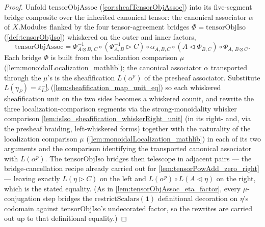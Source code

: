 \begin{proof}
  \leanok
  Unfold \(\mathrm{tensorObjAssoc}\) (\cref{cor:sheafTensorObjAssoc}) into its
  five-segment bridge composite over the inherited canonical tensor: the canonical
  associator \(\alpha\) of \(X.\mathrm{Modules}\) flanked by the four tensor-agreement
  bridges \(\Phi = \mathrm{tensorObjIso}\) (\cref{def:tensorObjIso}) whiskered on the
  outer and inner factors,
  \[
    \mathrm{tensorObjAssoc} = \Phi^{-1}_{A\otimes B,\,C}
      \circ (\Phi^{-1}_{A,B} \rhd C) \circ \alpha_{A,B,C}
      \circ (A \lhd \Phi_{B,C}) \circ \Phi_{A,\,B\otimes C}.
  \]
  Each bridge \(\Phi\) is built from the localization comparison \(\mu\)
  (\cref{lem:monoidalLocalization_mathlib}); the canonical associator \(\alpha\)
  transported through the \(\mu\)'s is the sheafification \(L(\alpha^{p})\) of the
  presheaf associator. Substitute \(L(\eta_P) = \varepsilon_{LP}^{-1}\)
  (\cref{lem:sheafification_map_unit_eq}) so each whiskered sheafification unit on the
  two sides becomes a whiskered counit, and rewrite the three localization-comparison
  segments via the strong-monoidality whisker comparison
  \cref{lem:isIso_sheafification_whiskerRight_unit} (in its right- and, via the
  presheaf braiding, left-whiskered forms) together with the naturality of the
  localization comparison \(\mu\) (\cref{lem:monoidalLocalization_mathlib}) in each of
  its two arguments and the comparison identifying the transported canonical associator
  with \(L(\alpha^{p})\). The \(\mathrm{tensorObjIso}\) bridges
  then telescope in adjacent pairs --- the bridge-cancellation recipe already carried
  out for \cref{lem:tensorPowAdd_zero_right} --- leaving exactly
  \(L(\eta \rhd C)\) on the left and \(L(\alpha^{p}) \circ L(A \lhd \eta)\) on the
  right, which is the stated equality. (As in \cref{lem:tensorObjAssoc_eta_factor},
  every \(\mu\)-conjugation step bridges the
  \(\mathrm{restrictScalars}(\mathbf{1})\) definitional decoration on \(\eta\)'s
  codomain against \(\mathrm{tensorObjIso}\)'s undecorated factor, so the rewrites are
  carried out up to that definitional equality.)
\end{proof}

